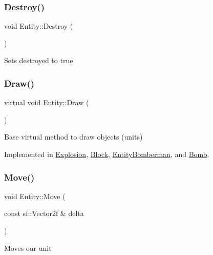 \subsubsection{\texorpdfstring{Destroy()}{Destroy()}}
{\footnotesize\ttfamily void Entity\+::\+Destroy (\begin{DoxyParamCaption}{ }\end{DoxyParamCaption})\hspace{0.3cm}{\ttfamily [inline]}}

Sets destroyed to true \mbox{\label{class_entity_a1d006ae3028ba4ddfc9b4f202ccddf55}} 
\subsubsection{\texorpdfstring{Draw()}{Draw()}}
{\footnotesize\ttfamily virtual void Entity\+::\+Draw (\begin{DoxyParamCaption}{ }\end{DoxyParamCaption})\hspace{0.3cm}{\ttfamily [pure virtual]}}

Base virtual method to draw objects (units) 

Implemented in \mbox{\hyperlink{class_explosion_a7c63ca80a8b15f581302be57342ce329}{Explosion}}, \mbox{\hyperlink{class_block_a6d49bcccea386310e034cddb0bab4620}{Block}}, \mbox{\hyperlink{class_entity_bomberman_a8cc4d0ad8f449ec8f15a1c11ea4b643e}{Entity\+Bomberman}}, and \mbox{\hyperlink{class_bomb_a307a7d181cd802b6ae7fb41505fd841f}{Bomb}}.

\mbox{\label{class_entity_ad605eeb16d800831fcf70b3a5be2da2d}} 
\subsubsection{\texorpdfstring{Move()}{Move()}}
{\footnotesize\ttfamily void Entity\+::\+Move (\begin{DoxyParamCaption}\item[{const sf\+::\+Vector2f \&}]{delta }\end{DoxyParamCaption})\hspace{0.3cm}{\ttfamily [inline]}}

Moves our unit \mbox{\label{class_entity_a11c74ff6a08f126fa0f1f927dba215d3}} 
